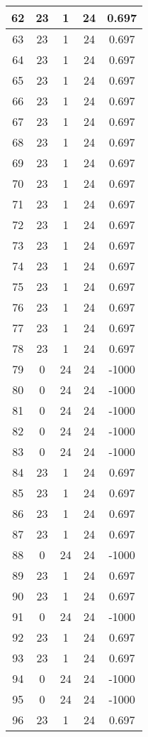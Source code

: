 \documentclass[letterpaper, 12pt]{article}
\begin{document}
\begin{longtable}{|c|c|c|c|c|}
\hline
62 & 23 & 1 & 24 & 0.697 \\
\hline
63 & 23 & 1 & 24 & 0.697 \\
\hline
64 & 23 & 1 & 24 & 0.697 \\
\hline
65 & 23 & 1 & 24 & 0.697 \\
\hline
66 & 23 & 1 & 24 & 0.697 \\
\hline
67 & 23 & 1 & 24 & 0.697 \\
\hline
68 & 23 & 1 & 24 & 0.697 \\
\hline
69 & 23 & 1 & 24 & 0.697 \\
\hline
70 & 23 & 1 & 24 & 0.697 \\
\hline
71 & 23 & 1 & 24 & 0.697 \\
\hline
72 & 23 & 1 & 24 & 0.697 \\
\hline
73 & 23 & 1 & 24 & 0.697 \\
\hline
74 & 23 & 1 & 24 & 0.697 \\
\hline
75 & 23 & 1 & 24 & 0.697 \\
\hline
76 & 23 & 1 & 24 & 0.697 \\
\hline
77 & 23 & 1 & 24 & 0.697 \\
\hline
78 & 23 & 1 & 24 & 0.697 \\
\hline
79 & 0 & 24 & 24 & -1000 \\
\hline
80 & 0 & 24 & 24 & -1000 \\
\hline
81 & 0 & 24 & 24 & -1000 \\
\hline
82 & 0 & 24 & 24 & -1000 \\
\hline
83 & 0 & 24 & 24 & -1000 \\
\hline
84 & 23 & 1 & 24 & 0.697 \\
\hline
85 & 23 & 1 & 24 & 0.697 \\
\hline
86 & 23 & 1 & 24 & 0.697 \\
\hline
87 & 23 & 1 & 24 & 0.697 \\
\hline
88 & 0 & 24 & 24 & -1000 \\
\hline
89 & 23 & 1 & 24 & 0.697 \\
\hline
90 & 23 & 1 & 24 & 0.697 \\
\hline
91 & 0 & 24 & 24 & -1000 \\
\hline
92 & 23 & 1 & 24 & 0.697 \\
\hline
93 & 23 & 1 & 24 & 0.697 \\
\hline
94 & 0 & 24 & 24 & -1000 \\
\hline
95 & 0 & 24 & 24 & -1000 \\
\hline
96 & 23 & 1 & 24 & 0.697 \\

\end{longtable}
\end{document}
